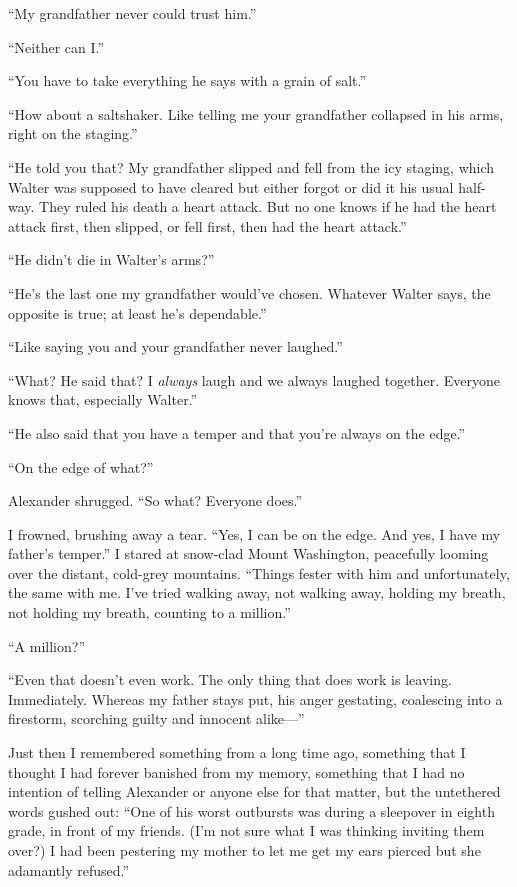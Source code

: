 ``My grandfather never could trust him.''

``Neither can I.''

``You have to take everything he says with a grain of salt.''

``How about a saltshaker. Like telling me your grandfather collapsed in
his arms, right on the staging.''

``He told you that? My grandfather slipped and fell from the icy
staging, which Walter was supposed to have cleared but either forgot or
did it his usual half-way. They ruled his death a heart attack. But no
one knows if he had the heart attack first, then slipped, or fell first,
then had the heart attack.''

``He didn't die in Walter's arms?''

``He's the last one my grandfather would've chosen. Whatever Walter
says, the opposite is true; at least he's dependable.''

``Like saying you and your grandfather never laughed.''

``What? He said that? I \emph{always} laugh and we always laughed
together. Everyone knows that, especially Walter.''

``He also said that you have a temper and that you're always on the
edge.''

``On the edge of what?''

Alexander shrugged. ``So what? Everyone does.''

I frowned, brushing away a tear. ``Yes, I can be on the edge. And yes, I
have my father's temper.'' I stared at snow-clad Mount Washington,
peacefully looming over the distant, cold-grey mountains. ``Things
fester with him and unfortunately, the same with me. I've tried walking
away, not walking away, holding my breath, not holding my breath,
counting to a million.''

``A million?''

``Even that doesn't even work. The only thing that does work is leaving.
Immediately. Whereas my father stays put, his anger gestating,
coalescing into a firestorm, scorching guilty and innocent alike---''

Just then I remembered something from a long time ago, something that I
thought I had forever banished from my memory, something that I had no
intention of telling Alexander or anyone else for that matter, but the
untethered words gushed out: ``One of his worst outbursts was during a
sleepover in eighth grade, in front of my friends. (I'm not sure what I
was thinking inviting them over?) I had been pestering my mother to let
me get my ears pierced but she adamantly refused.''

